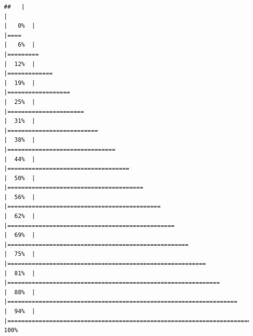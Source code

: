 \documentclass[
]{article}
\begin{document}
\begin{verbatim}
##   |                                                                              |                                                                      |   0%  |                                                                              |====                                                                  |   6%  |                                                                              |=========                                                             |  12%  |                                                                              |=============                                                         |  19%  |                                                                              |==================                                                    |  25%  |                                                                              |======================                                                |  31%  |                                                                              |==========================                                            |  38%  |                                                                              |===============================                                       |  44%  |                                                                              |===================================                                   |  50%  |                                                                              |=======================================                               |  56%  |                                                                              |============================================                          |  62%  |                                                                              |================================================                      |  69%  |                                                                              |====================================================                  |  75%  |                                                                              |=========================================================             |  81%  |                                                                              |=============================================================         |  88%  |                                                                              |==================================================================    |  94%  |                                                                              |======================================================================| 100%
\end{verbatim}
\end{document}
